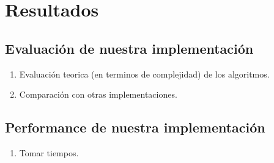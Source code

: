 \chapter{Resultados}

\section{Evaluación de nuestra implementación}

\begin{enumerate}
  \item Evaluación teorica (en terminos de complejidad) de los algoritmos.
  \item Comparación con otras implementaciones.
\end{enumerate}

\section{Performance de nuestra implementación}

\begin{enumerate}
  \item Tomar tiempos.
\end{enumerate}

